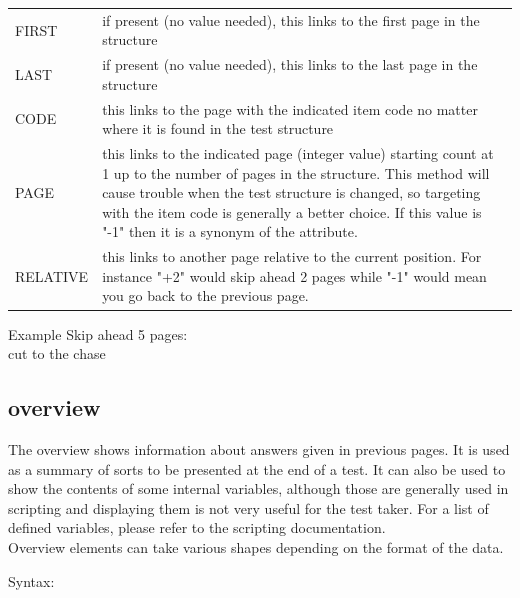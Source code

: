 \documentclass[12pt]{article} %
\newenvironment{keyword}{\leavevmode\color{magenta}}{}
\newenvironment{properties}
	{
    	\footnotesize\renewcommand{\arraystretch}{1.30}
  		\renewcommand{\tabcolsep}{0pt}
   		\begin{longtable}{>{\begin{keyword}}p{3.1cm}<{\end{keyword}}p{13.9cm}}
    	\hline
	}
	{
		\hline\end{longtable}\vspace{5mm}
	}
\begin{document}
\begin{properties}
\hline
FIRST & if present (no value needed), this links to the first page in the structure\\
LAST & if present (no value needed), this links to the last page in the structure\\
CODE & this links to the page with the indicated item code no matter where it is found in the test structure \\
PAGE & this links to the indicated page (integer value) starting count at 1 up to the number of pages in the structure.
This method will cause trouble when the test structure is changed, so targeting with the item code is generally a better choice.
If this value is "-1" then it is a synonym of the \kw{LAST} attribute. \\
RELATIVE & this links to another page relative to the current position.
For instance "+2" would skip ahead 2 pages while "-1" would mean you go back to the previous page. \\
\hline
\end{properties}
\vspace{0.1cm}

\begin{exampleBox}{Example}
	Skip ahead 5 pages:\\
	\kw{[@LINK RELATIVE="+5"@]}cut to the chase\kw{[@/LINK@]}
\end{exampleBox}

\subsection{overview}\label{subsec:overview}

The overview shows information about answers given in previous pages.
It is used as a summary of sorts to be presented at the end of a test.
It can also be used to show the contents of some internal variables, although those are generally used in scripting and displaying them is not very useful for the test taker. For a list of defined variables, please refer to the scripting documentation. \\
Overview elements can take various shapes depending on the format of the data.

Syntax:\hspace{0.5cm}\kw{[@OVERVIEW ... @]}
\end{document}

